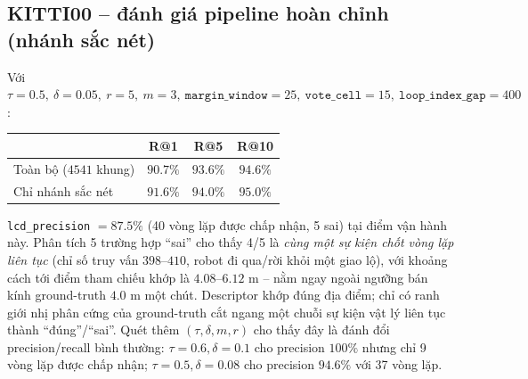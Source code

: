 \documentclass[a4paper,12pt]{article}
\begin{document}
\subsection{KITTI00 -- đánh giá pipeline hoàn chỉnh (nhánh sắc nét)}
Với $\tau=0.5,\ \delta=0.05,\ r=5,\ m=3,\ \texttt{margin\_window}=25,\ \texttt{vote\_cell}=15,\ \texttt{loop\_index\_gap}=400$:
\begin{center}
\begin{tabular}{lccc}
\toprule
& R@1 & R@5 & R@10 \\
\midrule
Toàn bộ ($4541$ khung) & $90.7\%$ & $93.6\%$ & $94.6\%$ \\
Chỉ nhánh sắc nét & $91.6\%$ & $94.0\%$ & $95.0\%$ \\
\bottomrule
\end{tabular}
\end{center}
\texttt{lcd\_precision} $= 87.5\%$ (40 vòng lặp được chấp nhận, 5 sai) tại điểm vận hành này. Phân tích 5 trường hợp ``sai'' cho thấy 4/5 là \emph{cùng một sự kiện chốt vòng lặp liên tục} (chỉ số truy vấn $398$--$410$, robot đi qua/rời khỏi một giao lộ), với khoảng cách tới điểm tham chiếu khớp là $4.08$--$6.12$ m -- nằm ngay ngoài ngưỡng bán kính ground-truth $4.0$ m một chút. Descriptor khớp đúng địa điểm; chỉ có ranh giới nhị phân cứng của ground-truth cắt ngang một chuỗi sự kiện vật lý liên tục thành ``đúng''/``sai''. Quét thêm $(\tau,\delta,m,r)$ cho thấy đây là đánh đổi precision/recall bình thường: $\tau=0.6,\delta=0.1$ cho precision $100\%$ nhưng chỉ 9 vòng lặp được chấp nhận; $\tau=0.5,\delta=0.08$ cho precision $94.6\%$ với 37 vòng lặp.
\end{document}
